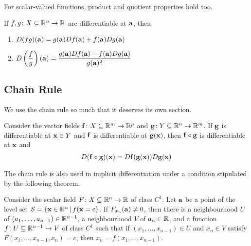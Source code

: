 \documentclass{article}
\begin{document}
For scalar-valued functions, product and quotient properties hold too.

\begin{theorem}
  If $f, g \colon X \subseteq \mathbb{R}^n \to \mathbb{R}$ are differentiable at $\mathbf{a}$, then
  \begin{enumerate}
    \item $D(fg)(\mathbf{a}) = g(\mathbf{a})Df(\mathbf{a}) + f(\mathbf{a})Dg(\mathbf{a})$
    \item $D\left( \dfrac{f}{g} \right)(\mathbf{a}) = \dfrac{g(\mathbf{a})Df(\mathbf{a}) - f(\mathbf{a})Dg(\mathbf{a})}{g(\mathbf{a})^2}$
  \end{enumerate}
\end{theorem}

\subsection{Chain Rule}

We use the chain rule so much that it deserves its own section.

\begin{theorem}
  Consider the vector fields $\mathbf{f} \colon X \subseteq \mathbb{R}^m \to \mathbb{R}^p$ and $\mathbf{g} \colon Y \subseteq \mathbb{R}^n \to \mathbb{R}^m$.
  If $\mathbf{g}$ is differentiable at $\mathbf{x} \in Y$ and $\mathbf{f}$ is differentiable at $\mathbf{g}(\mathbf{x})$, then $\mathbf{f} \circ \mathbf{g}$ is differentiable at $\mathbf{x}$ and
  \begin{align}
    D(\mathbf{f} \circ \mathbf{g})(\mathbf{x}) = D\mathbf{f}(\mathbf{g}(\mathbf{x})) D\mathbf{g}(\mathbf{x})
  \end{align}
\end{theorem}
The chain rule is also used in implicit differentiation under a condition stipulated by the following theorem.

\begin{theorem}
  Consider the scalar field $F \colon X \subseteq \mathbb{R}^n \to \mathbb{R}$ of class $C^1$.
  Let $\mathbf{a}$ be a point of the level set $S = \{\mathbf{x} \in \mathbb{R}^n \,|\, f(\mathbf{x} = c\}$.
  If $F_{x_n}(\mathbf{a}) \neq 0$, then there is a neighbourhood $U$ of $(a_1, \ldots, a_{n - 1}) \in \mathbb{R}^{n - 1}$, a neighbourhood $V$ of $a_n \in \mathbb{R}$, and a function $f \colon U \subseteq \mathbb{R}^{n - 1} \to V$ of class $C^1$ such that if $(x_1, \ldots, x_{n - 1}) \in U$ and $x_n \in V$ satisfy $F(x_1, \ldots, x_{n - 1}, x_n) = c$, then $x_n = f(x_1, \ldots, x_{n - 1})$.
\end{theorem}
\end{document}

